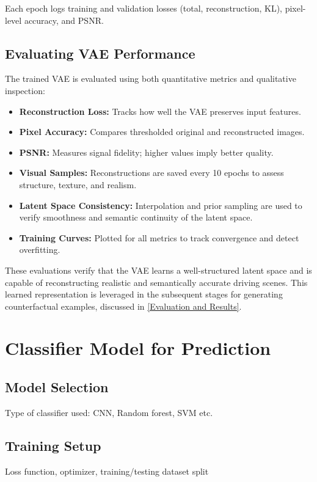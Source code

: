 Each epoch logs training and validation losses (total, reconstruction, KL), pixel-level accuracy, and PSNR.

\subsection{Evaluating VAE Performance} \label{subsec:vae_evaluation}

The trained VAE is evaluated using both quantitative metrics and qualitative inspection:

\begin{itemize}
    \item \textbf{Reconstruction Loss:} Tracks how well the VAE preserves input features.
    \item \textbf{Pixel Accuracy:} Compares thresholded original and reconstructed images.
    \item \textbf{PSNR:} Measures signal fidelity; higher values imply better quality.
    \item \textbf{Visual Samples:} Reconstructions are saved every 10 epochs to assess structure, texture, and realism.
    \item \textbf{Latent Space Consistency:} Interpolation and prior sampling are used to verify smoothness and semantic continuity of the latent space.
    \item \textbf{Training Curves:} Plotted for all metrics to track convergence and detect overfitting.
\end{itemize}

These evaluations verify that the VAE learns a well-structured latent space and is capable of reconstructing realistic and semantically accurate driving scenes. This learned representation is leveraged in the subsequent stages for generating counterfactual examples, discussed in \autoref{Evaluation and Results}.





\section{Classifier Model for Prediction}

\subsection{Model Selection}
Type of classifier used: CNN, Random forest, SVM etc.

\subsection{Training Setup}
Loss function, optimizer, training/testing dataset split

